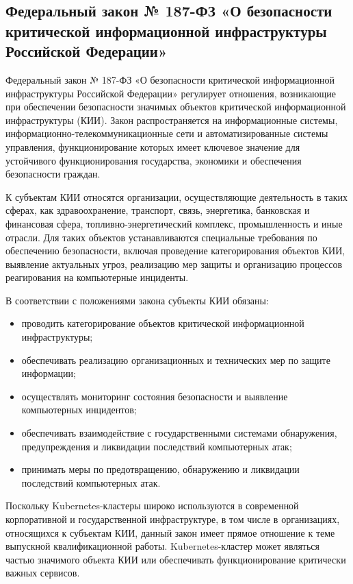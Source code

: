 \subsection{Федеральный закон № 187-ФЗ «О безопасности критической информационной инфраструктуры Российской Федерации»}

Федеральный закон № 187-ФЗ «О безопасности критической информационной инфраструктуры Российской Федерации» \cite{FZ187} регулирует отношения, возникающие при обеспечении безопасности значимых объектов критической информационной инфраструктуры (КИИ). Закон распространяется на информационные системы, информационно-телекоммуникационные сети и автоматизированные системы управления, функционирование которых имеет ключевое значение для устойчивого функционирования государства, экономики и обеспечения безопасности граждан.

К субъектам КИИ относятся организации, осуществляющие деятельность в таких сферах, как здравоохранение, транспорт, связь, энергетика, банковская и финансовая сфера, топливно-энергетический комплекс, промышленность и иные отрасли. Для таких объектов устанавливаются специальные требования по обеспечению безопасности, включая проведение категорирования объектов КИИ, выявление актуальных угроз, реализацию мер защиты и организацию процессов реагирования на компьютерные инциденты.

В соответствии с положениями закона субъекты КИИ обязаны:
\begin{itemize}
    \item проводить категорирование объектов критической информационной инфраструктуры;
    \item обеспечивать реализацию организационных и технических мер по защите информации;
    \item осуществлять мониторинг состояния безопасности и выявление компьютерных инцидентов;
    \item обеспечивать взаимодействие с государственными системами обнаружения, предупреждения и ликвидации последствий компьютерных атак;
    \item принимать меры по предотвращению, обнаружению и ликвидации последствий компьютерных атак.
\end{itemize}

Поскольку Kubernetes-кластеры широко используются в современной корпоративной и государственной инфраструктуре, в том числе в организациях, относящихся к субъектам КИИ, данный закон имеет прямое отношение к теме выпускной квалификационной работы. Kubernetes-кластер может являться частью значимого объекта КИИ или обеспечивать функционирование критически важных сервисов.

